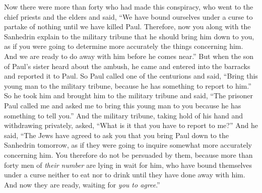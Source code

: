 \begin{biblechapter}
\verse Now there were more than forty who had made this conspiracy,
\verse who went to the chief priests and the elders and said, “We have bound ourselves under a curse to partake of nothing until we have killed Paul.
\verse Therefore, now you along with the Sanhedrin explain to the military tribune that he should bring him down to you, as if you were going to determine more accurately the things concerning him. And we are ready to do away with him before he comes near.”
\verse But when the son of Paul’s sister heard about the ambush, he came and entered into the barracks and reported it to Paul.
\verse So Paul called one of the centurions and said, “Bring this young man to the military tribune, because he has something to report to him.”
\verse So he took him and brought him to the military tribune and said, “The prisoner Paul called me and asked me to bring this young man to you because he has something to tell you.”
\verse And the military tribune, taking hold of his hand and withdrawing privately, asked, “What is it that you have to report to me?”
\verse And he said, “The Jews have agreed to ask you that you bring Paul down to the Sanhedrin tomorrow, as if they were going to inquire somewhat more accurately concerning him.
\verse You therefore do not be persuaded by them, because more than forty men of \textit{their number} are lying in wait for him, who have bound themselves under a curse neither to eat nor to drink until they have done away with him. And now they are ready, waiting for \textit{you to agree}.”

\end{biblechapter}

